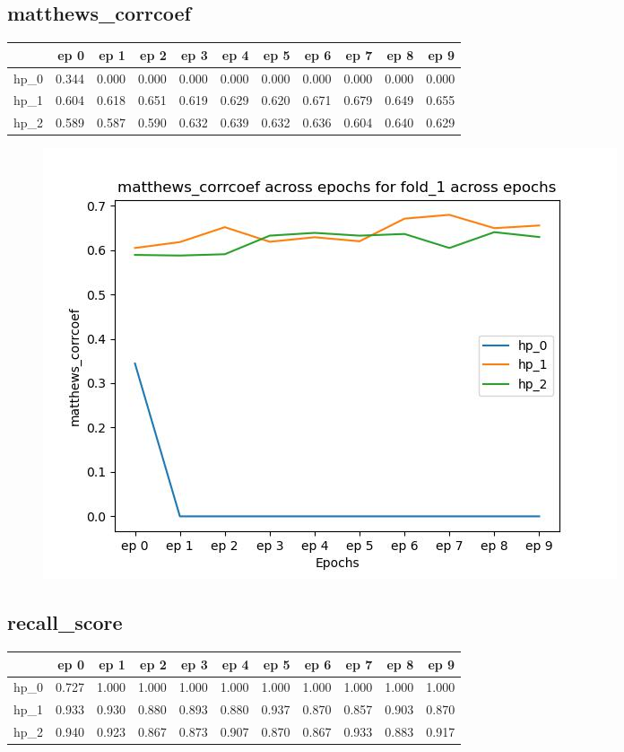 \documentclass{article}
\begin{document}
\subsection{matthews\_corrcoef}
\begin{tabular}{lrrrrrrrrrr}
\toprule
{} &   ep 0 &   ep 1 &   ep 2 &   ep 3 &   ep 4 &   ep 5 &   ep 6 &   ep 7 &   ep 8 &   ep 9 \\
\midrule
hp\_0 &  0.344 &  0.000 &  0.000 &  0.000 &  0.000 &  0.000 &  0.000 &  0.000 &  0.000 &  0.000 \\
hp\_1 &  0.604 &  0.618 &  0.651 &  0.619 &  0.629 &  0.620 &  0.671 &  0.679 &  0.649 &  0.655 \\
hp\_2 &  0.589 &  0.587 &  0.590 &  0.632 &  0.639 &  0.632 &  0.636 &  0.604 &  0.640 &  0.629 \\
\bottomrule
\end{tabular}

\begin{figure}[H]
\includegraphics[scale = 0.75]{fold_1/matthews_corrcoef}
\end{figure}
\subsection{recall\_score}
\begin{tabular}{lrrrrrrrrrr}
\toprule
{} &   ep 0 &   ep 1 &   ep 2 &   ep 3 &   ep 4 &   ep 5 &   ep 6 &   ep 7 &   ep 8 &   ep 9 \\
\midrule
hp\_0 &  0.727 &  1.000 &  1.000 &  1.000 &  1.000 &  1.000 &  1.000 &  1.000 &  1.000 &  1.000 \\
hp\_1 &  0.933 &  0.930 &  0.880 &  0.893 &  0.880 &  0.937 &  0.870 &  0.857 &  0.903 &  0.870 \\
hp\_2 &  0.940 &  0.923 &  0.867 &  0.873 &  0.907 &  0.870 &  0.867 &  0.933 &  0.883 &  0.917 \\
\bottomrule
\end{tabular}
\end{document}
